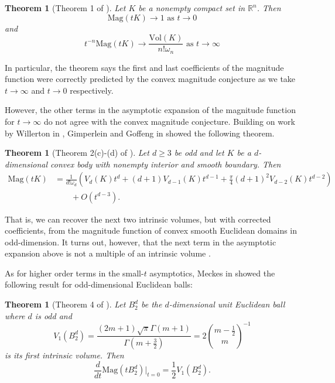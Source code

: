 \documentclass[11pt]{article}
\theoremstyle{mythm}
\newtheorem{theo}[defn]{Theorem}
\begin{document}
\begin{theo}[Theorem 1 of \cite{barcelo_magnitudes_2016}]\label{theo:bcasym}
Let $K$ be a nonempty compact set in $\mathbb{R}^n$. Then
\begin{equation*}
\text{Mag}(tK) \to 1 \text{ as $t \to 0$}
\end{equation*}
and
\begin{equation*}
t^{-n}\text{Mag}(tK) \to \frac{\text{Vol}(K)}{n!\omega_n} \text{ as $t\to\infty$}
\end{equation*}
\end{theo}

In particular, the theorem says the first and last coefficients of the magnitude function were correctly predicted by the convex magnitude conjecture as we take $t \to\infty$ and $t\to0$ respectively.

However, the other terms in the asymptotic expansion of the magnitude function for $t\to\infty$ do not agree with the convex magnitude conjecture. Building on work by Willerton in \cite{willerton_magnitude_2017}, Gimperlein and Goffeng in \cite{gimperlein_magnitude_2017} showed the following theorem.

\begin{theo}[Theorem 2(c)-(d) of \cite{gimperlein_magnitude_2017}]\label{theo:largeasym}
Let $d\geq3$ be odd and let $K$ be a $d$-dimensional convex body with nonempty interior and smooth boundary. Then
\begin{align*}
\text{Mag}(tK) &= \frac{1}{d!\omega_d}\left(V_d(K)t^d+(d+1)V_{d-1}(K)t^{d-1}+\frac{\pi}{4}(d+1)^2V_{d-2}(K)t^{d-2}\right) \\
&\qquad+ O(t^{d-3}).
\end{align*}
\end{theo}

That is, we can recover the next two intrinsic volumes, but with corrected coefficients, from the magnitude function of convex smooth Euclidean domains in odd-dimension. It turns out, however, that the next term in the asymptotic expansion above is not a multiple of an intrinsic volume \cite{meckes_magnitude_2019}.

As for higher order terms in the small-$t$ asymptotics, Meckes in \cite{meckes_magnitude_2019} showed the following result for odd-dimensional Euclidean balls:

\begin{theo}[Theorem 4 of \cite{meckes_magnitude_2019}]\label{theo:firstorder}
Let $B_2^d$ be the $d$-dimensional unit Euclidean ball where $d$ is odd and
\begin{equation*}
V_1\left(B_2^d\right) = \frac{(2m+1)\sqrt{\pi}\Gamma(m+1)}{\Gamma\left(m+\frac{3}{2}\right)} = 2\binom{m-\frac{1}{2}}{m}^{-1}
\end{equation*}
is its first intrinsic volume. Then
\begin{equation*}
\frac{d}{dt}\text{Mag}(tB_2^d)\big\vert_{t=0} = \frac{1}{2}V_1(B_2^d).
\end{equation*}
\end{theo}
\end{document}
